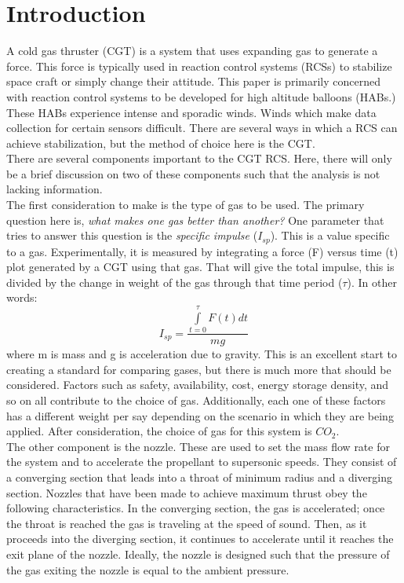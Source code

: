 \documentclass[letterpaper,12pt]{article}
\begin{document}
\section{Introduction}
A cold gas thruster (CGT) is a system that uses expanding gas to generate a force. This force is typically used in reaction control systems (RCSs) to stabilize space craft or simply change their attitude. This paper is primarily concerned with reaction control systems to be developed for high altitude balloons (HABs.) These HABs experience intense and sporadic winds. Winds which make data collection for certain sensors difficult. There are several ways in which a RCS can achieve stabilization, but the method of choice here is the CGT.\\
There are several components important to the CGT RCS. Here, there will only be a brief discussion on two of these components such that the analysis is not lacking information. \\
The first consideration to make is the type of gas to be used. The primary question here is, \textit{what makes one gas better than another?} One parameter that tries to answer this question is the \textit{specific impulse} ($I_{sp}$). This is a value specific to a gas. Experimentally, it is measured by integrating a force (F) versus time (t) plot generated by a CGT using that gas. That will give the total impulse, this is divided by the change in weight of the gas through that time period ($\tau$). In other words:
\begin{equation}
	I_{sp} = \frac{\displaystyle\int\limits_{t=0}^{\tau}F(t)dt}{mg}
\end{equation}
where m is mass and g is acceleration due to gravity. This is an excellent start to creating a standard for comparing gases, but there is much more that should be considered. Factors such as safety, availability, cost, energy storage density, and so on all contribute to the choice of gas. Additionally, each one of these factors has a different weight per say depending on the scenario in which they are being applied. After consideration, the choice of gas for this system is $CO_2$.\\
The other component is the nozzle. These are used to set the mass flow rate for the system and to accelerate the propellant to supersonic speeds. They consist of a converging section that leads into a throat of minimum radius and a diverging section. Nozzles that have been made to achieve maximum thrust obey the following characteristics. In the converging section, the gas is accelerated; once the throat is reached the gas is traveling at the speed of sound. Then, as it proceeds into the diverging section, it continues to accelerate until it reaches the exit plane of the nozzle. Ideally, the nozzle is designed such that the pressure of the gas exiting the nozzle is equal to the ambient pressure.
\end{document}
